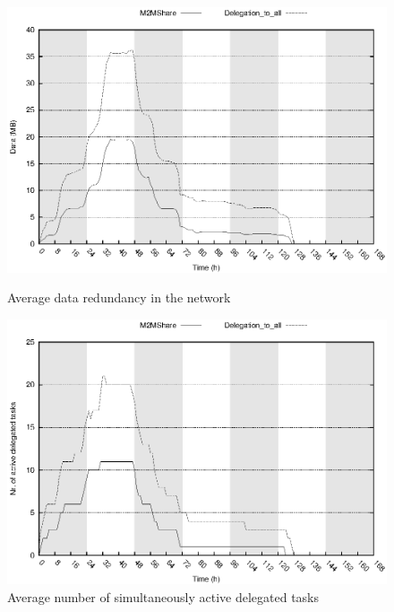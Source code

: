\begin{figure}[ht]
\begin{minipage}[b]{1\linewidth}
\centering
\includegraphics[scale=0.70]{grafici/ridondanza.eps}
\caption{Average data redundancy in the network}
\label{graficoRidondanzaData}
\end{minipage}
\hspace{0.5cm}
\begin{minipage}[b]{1\linewidth}
\centering
\includegraphics[scale=0.70]{grafici/delegheAttive.eps}
\caption{Average number of simultaneously active delegated tasks}
\label{graficoDelegheAttive}
\end{minipage}
\end{figure}

\pagebreak 
